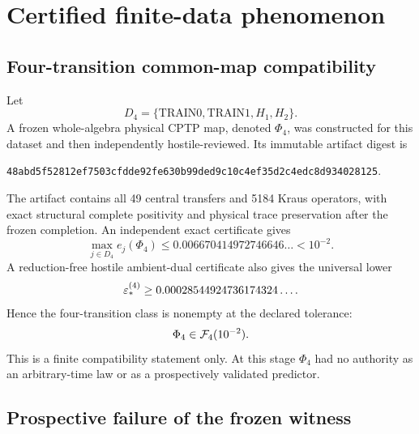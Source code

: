 \section{Certified finite-data phenomenon}
\label{sec:results}

\subsection{Four-transition common-map compatibility}

Let
\begin{equation}
D_4=\{\mathrm{TRAIN0},\mathrm{TRAIN1},H_1,H_2\}.
\end{equation}
A frozen whole-algebra physical CPTP map, denoted $\Phi_4$, was constructed for this dataset and then independently hostile-reviewed.  Its immutable artifact digest is
\begin{center}
\texttt{48abd5f52812ef7503cfdde92fe630b99ded9c10c4ef35d2c4edc8d934028125}.
\end{center}
The artifact contains all 49 central transfers and 5184 Kraus operators, with exact structural complete positivity and physical trace preservation after the frozen completion.  An independent exact certificate gives
\begin{equation}
\max_{j\in D_4}e_j(\Phi_4)
\le 0.006670414972746646\ldots <10^{-2}.
\label{eq:k4-upper}
\end{equation}
A reduction-free hostile ambient-dual certificate also gives the universal lower
\begin{equation}
\varepsilon_*^{(4)}\ge 0.00028544924736174324\ldots .
\end{equation}
Hence the four-transition class is nonempty at the declared tolerance:
\begin{equation}
\Phi_4\in\mathcal F_4(10^{-2}).
\label{eq:phi4-feasible}
\end{equation}
This is a finite compatibility statement only.  At this stage $\Phi_4$ had no authority as an arbitrary-time law or as a prospectively validated predictor.

\subsection{Prospective failure of the frozen witness}

